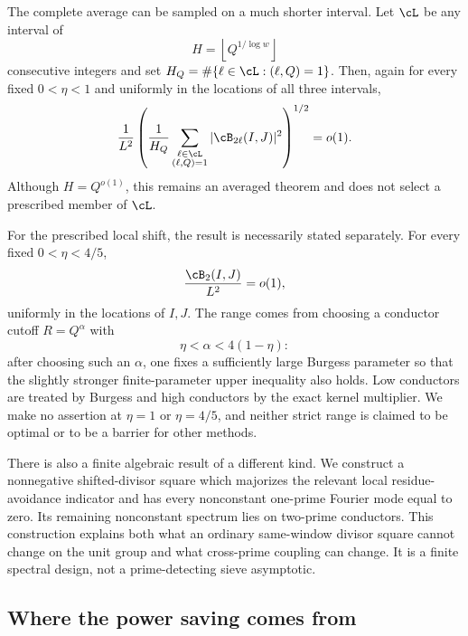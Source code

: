 The complete average can be sampled on a much shorter interval.  Let $\cL$
be any interval of
\begin{equation}\label{eq:intro-short-shift-length}
 H=\left\lfloor Q^{1/\log w}\right\rfloor
\end{equation}
consecutive integers and set
$H_Q=\#\{\ell\in\cL:(\ell,Q)=1\}$.  Then, again for every fixed
$0<\eta<1$ and uniformly in the locations of all three intervals,
\begin{equation}\label{eq:intro-short-shift-result}
 \frac1{L^2}
 \left(
  \frac1{H_Q}
  \sum_{\substack{\ell\in\cL\\(\ell,Q)=1}}
  |\cB_{2\ell}(I,J)|^2
 \right)^{1/2}
 =o(1).
\end{equation}
Although $H=Q^{o(1)}$, this remains an averaged theorem and does not select a
prescribed member of $\cL$.

For the prescribed local shift, the result is necessarily stated separately.
For every fixed $0<\eta<4/5$,
\begin{equation}\label{eq:intro-fixed-shift-result}
 \frac{\cB_2(I,J)}{L^2}=o(1),
\end{equation}
uniformly in the locations of $I,J$.  The range comes from choosing a
conductor cutoff $R=Q^\alpha$ with
\begin{equation}\label{eq:intro-cutoff-compatibility}
 \eta<\alpha<4(1-\eta):
\end{equation}
after choosing such an $\alpha$, one fixes a sufficiently large Burgess
parameter so that the slightly stronger finite-parameter upper inequality
also holds.  Low conductors are treated by Burgess and high conductors by the exact kernel
multiplier.  We make no assertion at $\eta=1$ or $\eta=4/5$, and neither
strict range is claimed to be optimal or to be a barrier for other methods.

There is also a finite algebraic result of a different kind.  We construct a
nonnegative shifted-divisor square which majorizes the relevant local
residue-avoidance indicator and has every nonconstant one-prime Fourier mode
equal to zero.  Its remaining nonconstant spectrum lies on two-prime
conductors.  This construction explains both what an ordinary same-window
divisor square cannot change on the unit group and what cross-prime coupling
can change.  It is a finite spectral design, not a prime-detecting sieve
asymptotic.

\subsection{Where the power saving comes from}

